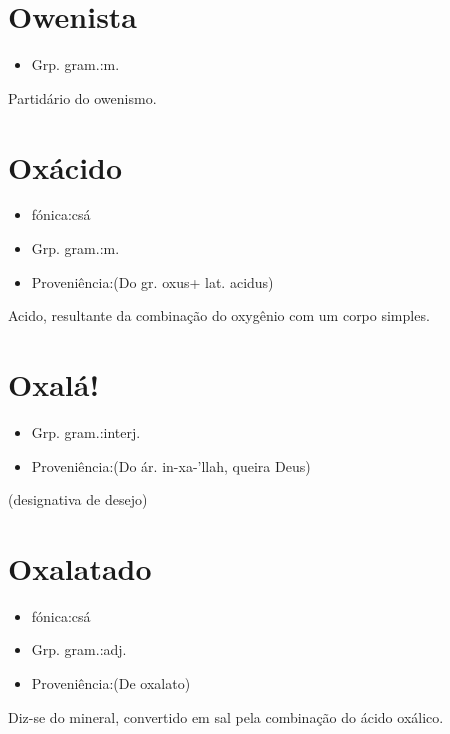\section{Owenista}
\begin{itemize}
\item {Grp. gram.:m.}
\end{itemize}
Partidário do owenismo.
\section{Oxácido}
\begin{itemize}
\item {fónica:csá}
\end{itemize}
\begin{itemize}
\item {Grp. gram.:m.}
\end{itemize}
\begin{itemize}
\item {Proveniência:(Do gr. \textunderscore oxus\textunderscore  + lat. \textunderscore acidus\textunderscore )}
\end{itemize}
Acido, resultante da combinação do oxygênio com um corpo simples.
\section{Oxalá!}
\begin{itemize}
\item {Grp. gram.:interj.}
\end{itemize}
\begin{itemize}
\item {Proveniência:(Do ár. \textunderscore in-xa-'llah\textunderscore , queira Deus)}
\end{itemize}
(designativa de \textunderscore desejo\textunderscore )
\section{Oxalatado}
\begin{itemize}
\item {fónica:csá}
\end{itemize}
\begin{itemize}
\item {Grp. gram.:adj.}
\end{itemize}
\begin{itemize}
\item {Proveniência:(De \textunderscore oxalato\textunderscore )}
\end{itemize}
Diz-se do mineral, convertido em sal pela combinação do ácido oxálico.

